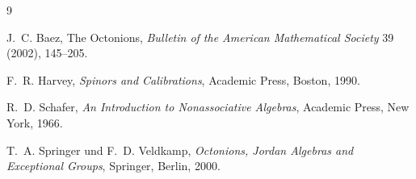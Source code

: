 \documentclass[11pt,a4paper]{article}
\theoremstyle{definition}
\begin{document}
\begin{thebibliography}{9}

J.~C. Baez,
\newblock The Octonions,
\newblock \emph{Bulletin of the American Mathematical Society}
39 (2002), 145--205.

F.~R. Harvey,
\newblock \emph{Spinors and Calibrations},
\newblock Academic Press, Boston, 1990.

R.~D. Schafer,
\newblock \emph{An Introduction to Nonassociative Algebras},
\newblock Academic Press, New York, 1966.

T.~A. Springer und F.~D. Veldkamp,
\newblock \emph{Octonions, Jordan Algebras and Exceptional Groups},
\newblock Springer, Berlin, 2000.

\end{thebibliography}
\end{document}
